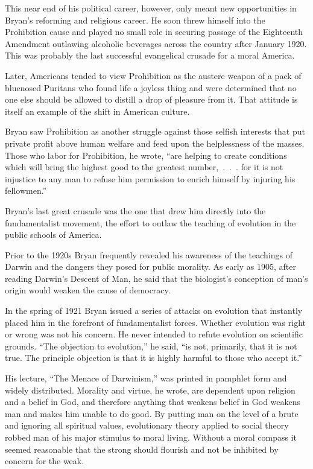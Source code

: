 This near end of his political career, however, only meant new opportunities in Bryan’s reforming
and religious career. He soon threw himself into the Prohibition cause and played no small role in
securing passage of the Eighteenth Amendment outlawing alcoholic beverages across the country after
January 1920. This was probably the last successful evangelical crusade for a moral America.

Later, Americans tended to view Prohibition as the austere weapon of a pack of bluenosed Puritans
who found life a joyless thing and were determined that no one else should be allowed to distill a
drop of pleasure from it. That attitude is itself an example of the shift in American culture.

Bryan saw Prohibition as another struggle against those selfish interests that put private profit
above human welfare and feed upon the helplessness of the masses. Those who labor for Prohibition,
he wrote, “are helping to create conditions which will bring the highest good to the greatest
number,~.~.~. for it is not injustice to any man to refuse him permission to enrich himself by
injuring his fellowmen.”

Bryan’s last great crusade was the one that drew him directly into the fundamentalist movement, the
effort to outlaw the teaching of evolution in the public schools of America.

Prior to the 1920s Bryan frequently revealed his awareness of the teachings of Darwin and the
dangers they posed for public morality. As early as 1905, after reading Darwin’s Descent of Man, he
said that the biologist’s conception of man’s origin would weaken the cause of democracy.

In the spring of 1921 Bryan issued a series of attacks on evolution that instantly placed him in the
forefront of fundamentalist forces. Whether evolution was right or wrong was not his concern. He
never intended to refute evolution on scientific grounds. “The objection to evolution,” he said, “is
not, primarily, that it is not true. The principle objection is that it is highly harmful to those
who accept it.”

His lecture, “The Menace of Darwinism,” was printed in pamphlet form and widely distributed.
Morality and virtue, he wrote, are dependent upon religion and a belief in God, and therefore
anything that weakens belief in God weakens man and makes him unable to do good. By putting man on
the level of a brute and ignoring all spiritual values, evolutionary theory applied to social theory
robbed man of his major stimulus to moral living. Without a moral compass it seemed reasonable that
the strong should flourish and not be inhibited by concern for the weak.

